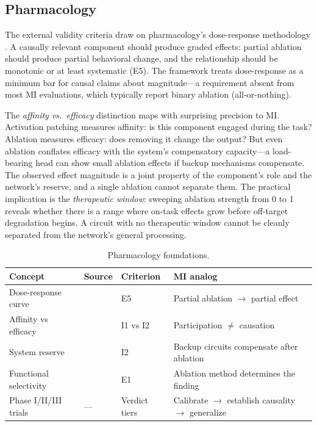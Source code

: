 \documentclass{article}
\begin{document}
\subsection{Pharmacology}
\label{sec:pharma}

The external validity criteria draw on pharmacology's dose-response methodology \citep{rang2006drug}. A causally relevant component should produce graded effects: partial ablation should produce partial behavioral change, and the relationship should be monotonic or at least systematic (E5). The framework treats dose-response as a minimum bar for causal claims about magnitude---a requirement absent from most MI evaluations, which typically report binary ablation (all-or-nothing).

The \emph{affinity vs.\ efficacy} distinction maps with surprising precision to MI. Activation patching measures affinity: is this component engaged during the task? Ablation measures efficacy: does removing it change the output? But even ablation conflates efficacy with the system's compensatory capacity---a load-bearing head can show small ablation effects if backup mechanisms compensate. The observed effect magnitude is a joint property of the component's role and the network's reserve, and a single ablation cannot separate them. The practical implication is the \emph{therapeutic window}: sweeping ablation strength from 0 to 1 reveals whether there is a range where on-task effects grow before off-target degradation begins. A circuit with no therapeutic window cannot be cleanly separated from the network's general processing.

\begin{table}[H]
\centering\small
\caption{Pharmacology foundations.}
\renewcommand{\arraystretch}{1.12}
\begin{tabular}{@{}l>{\raggedright\arraybackslash}p{2.2cm}l>{\raggedright\arraybackslash}p{4.5cm}@{}}
\toprule
\textbf{Concept} & \textbf{Source} & \textbf{Criterion} & \textbf{MI analog} \\
\midrule
Dose-response curve & \citet{hill1910possible} & E5 & Partial ablation $\to$ partial effect \\
\midrule
Affinity vs efficacy & \citet{stephenson1956modification} & I1 vs I2 & Participation $\neq$ causation \\
\midrule
System reserve & \citet{black1983operational} & I2 & Backup circuits compensate after ablation \\
\midrule
Functional selectivity & \citet{kenakin2004functional} & E1 & Ablation method determines the finding \\
\midrule
Phase I/II/III trials & --- & Verdict tiers & Calibrate $\to$ establish causality $\to$ generalize \\
\bottomrule
\end{tabular}
\end{table}
\end{document}
